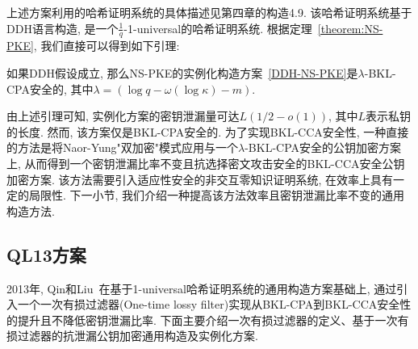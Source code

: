 上述方案利用的哈希证明系统的具体描述见第四章的构造4.9. 该哈希证明系统基于DDH语言构造, 是一个$\frac{1}{q}$-1-universal的哈希证明系统. 根据定理~\ref{theorem:NS-PKE}, 我们直接可以得到如下引理:
\begin{lemma}
如果DDH假设成立, 那么NS-PKE的实例化构造方案~\ref{DDH-NS-PKE}是$\lambda$-BKL-CPA安全的, 其中$\lambda = (\log q - \omega(\log\kappa) - m)$. 
\end{lemma}

\begin{note}
由上述引理可知, 实例化方案的密钥泄漏量可达$L(1/2-o(1))$, 其中$L$表示私钥的长度. 然而, 该方案仅是BKL-CPA安全的. 为了实现BKL-CCA安全性, 一种直接的方法是将Naor-Yung"双加密"模式应用与一个$\lambda$-BKL-CPA安全的公钥加密方案上, 从而得到一个密钥泄漏比率不变且抗选择密文攻击安全的BKL-CCA安全公钥加密方案. 该方法需要引入适应性安全的非交互零知识证明系统, 在效率上具有一定的局限性. 下一小节, 我们介绍一种提高该方法效率且密钥泄漏比率不变的通用构造方法.
\end{note}


\subsection{QL13方案}
2013年, Qin和Liu~\cite{Qin-ASIACRYPT-2013}在基于1-universal哈希证明系统的通用构造方案基础上, 通过引入一个一次有损过滤器(One-time lossy filter)实现从BKL-CPA到BKL-CCA安全性的提升且不降低密钥泄漏比率. 下面主要介绍一次有损过滤器的定义、基于一次有损过滤器的抗泄漏公钥加密通用构造及实例化方案.

